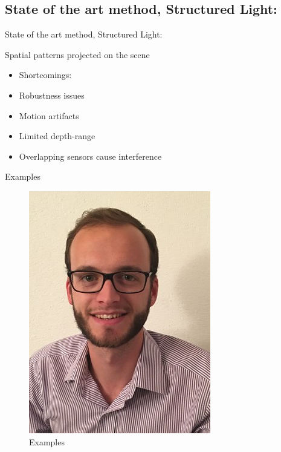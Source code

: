 \subsection{State of the art method, Structured Light:}
\begin{frame}{State of the art method, Structured Light:}

Spatial patterns projected on the scene

\begin{itemize}
\item Shortcomings:
\item Robustness issues
\item Motion artifacts
\item Limited depth-range
\item Overlapping sensors cause interference
\end{itemize}

\end{frame}

\begin{frame}{Examples}
\begin{figure}
\includegraphics[scale=0.9]{pictures/polop}
\caption{Examples}
\end{figure}
\end{frame}


